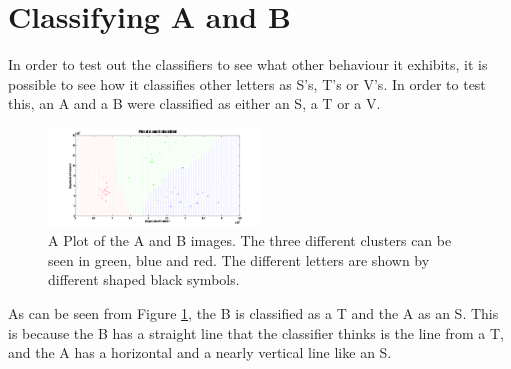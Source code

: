 \documentclass[a4paper]{article}
\begin{document}
\section{Classifying A and B}
In order to test out the classifiers to see what other behaviour it exhibits, it is possible to see how it classifies other letters as S's, T's or V's. In order to test this, an A and a B were classified as either an S, a T or a V.
\begin{figure}[H]
\centering
\includegraphics[width=0.5\textwidth]{plotAB.png}
\caption{\label{fig:plotAB}A Plot of the A and B images. The three different clusters can be seen in green, blue and red. The different letters are shown by different shaped black symbols.}
\end{figure}
As can be seen from Figure \ref{fig:plotAB}, the B is classified as a T and the A as an S. This is because the B has a straight line that the classifier thinks is the line from a T, and the A has a horizontal and a nearly vertical line like an S. 
\end{document}
